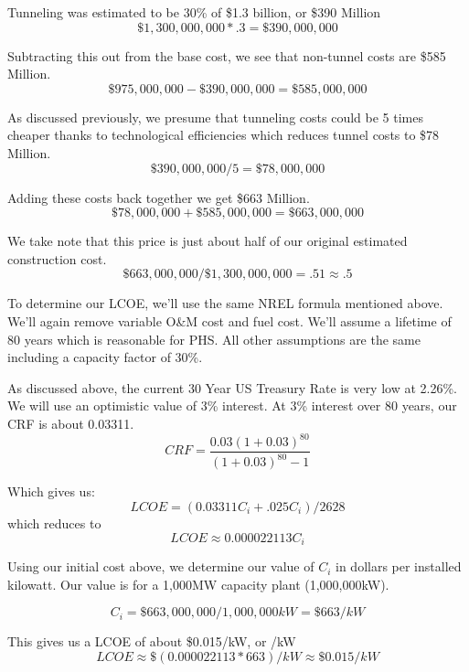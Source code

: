 Tunneling was estimated to be 30\% of \$1.3 billion, or \$390 Million
\[ \$1,300,000,000 * .3 = \$390,000,000\]

Subtracting this out from the base cost, we see that non-tunnel costs are \$585 Million.
\[ \$975,000,000 - \$390,000,000 = \$585,000,000\]

As discussed previously, we presume that tunneling costs could be 5 times cheaper thanks to technological efficiencies which reduces tunnel costs to \$78 Million.
\[ \$390,000,000 / 5 = \$78,000,000\]

Adding these costs back together we get \$663 Million.
\[ \$78,000,000 + \$585,000,000 = \$663,000,000 \]

We take note that this price is just about half of our original estimated construction cost.
\[  \$663,000,000  / \$1,300,000,000 = .51 \approx .5 \]

To determine our LCOE, we'll use the same NREL formula mentioned above. We'll again remove variable O\&M cost and fuel cost. We'll assume a lifetime of 80 years which is reasonable for PHS. All other assumptions are the same including a capacity factor of 30\%.

As discussed above, the current 30 Year US Treasury Rate is very low at 2.26\%. We will use an optimistic value of 3\% interest. At 3\% interest over 80 years, our CRF is about 0.03311.
\[ \displaystyle CRF={\frac {0.03(1+0.03)^{80}}{(1+0.03)^{80}-1}} \]

Which gives us:
\[ LCOE = (0.03311C_i + .025C_i) / 2628 \]
which reduces to
\[ LCOE \approx 0.000022113 C_i \]

Using our initial cost above, we determine our value of $C_i$ in dollars per installed kilowatt. Our value is for a 1,000MW capacity plant (1,000,000kW).

\[ C_i = \$663,000,000 / 1,000,000kW = \$663/kW\]

This gives us a LCOE of about \$0.015/kW, or /kW
\[ LCOE \approx \$(0.000022113 * 663)/kW \approx \$0.015/kW \]
